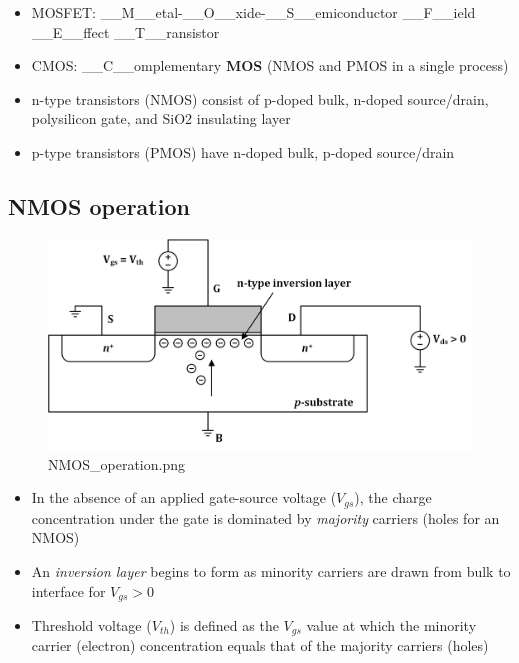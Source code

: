 \documentclass[11pt]{article}
\providecommand{\tightlist}{%
      \setlength{\itemsep}{0pt}\setlength{\parskip}{0pt}}
\begin{document}
    \begin{itemize}
\tightlist
\item
  MOSFET: \_\_M\_\_etal-\_\_O\_\_xide-\_\_S\_\_emiconductor
  \_\_F\_\_ield \_\_E\_\_ffect \_\_T\_\_ransistor
\item
  CMOS: \_\_C\_\_omplementary \textbf{MOS} (NMOS and PMOS in a single
  process)
\item
  n-type transistors (NMOS) consist of p-doped bulk, n-doped
  source/drain, polysilicon gate, and SiO2 insulating layer
\item
  p-type transistors (PMOS) have n-doped bulk, p-doped source/drain
\end{itemize}

    \hypertarget{nmos-operation}{%
\subsection{NMOS operation}\label{nmos-operation}}

    \begin{figure}
\centering
\includegraphics{NMOS_operation.png}
\caption{NMOS\_operation.png}
\end{figure}

    \begin{itemize}
\tightlist
\item
  In the absence of an applied gate-source voltage (\(V_{gs}\)), the
  charge concentration under the gate is dominated by \emph{majority}
  carriers (holes for an NMOS)
\item
  An \emph{inversion layer} begins to form as minority carriers are
  drawn from bulk to interface for \(V_{gs} > 0\)
\item
  Threshold voltage (\(V_{th}\)) is defined as the \(V_{gs}\) value at
  which the minority carrier (electron) concentration equals that of the
  majority carriers (holes)
\end{itemize}
\end{document}
